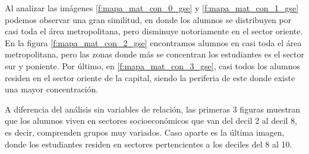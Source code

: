 Al analizar las imágenes \ref{f:mapa_mat_con_0_gse} y \ref{f:mapa_mat_con_1_gse} podemos observar una gran similitud, en donde los alumnos se distribuyen por casi toda el área metropolitana, pero disminuye notoriamente en el sector oriente. En la figura \ref{f:mapa_mat_con_2_gse} encontramos alumnos en casi toda el área metropolitana, pero las zonas donde más se concentran los estudiantes es el sector sur y poniente. Por último, en \ref{f:mapa_mat_con_3_gse}, casi todos los alumnos residen en el sector oriente de la capital, siendo la periferia de este donde existe una mayor concentración.

A diferencia del análisis sin variables de relación, las primeras 3 figuras muestran que los alumnos viven en sectores socioeconómicos que van del decil 2 al decil 8, es decir, comprenden grupos muy variados. Caso aparte es la última imagen, donde los estudiantes residen en sectores pertencientes a los deciles del 8 al 10.

